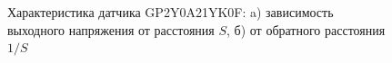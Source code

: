 \documentclass[12pt]{article}
\begin{document}
\begin{figure}[H]
    \centering
    \begin{minipage}[H]{0.49\linewidth}
    \end{minipage}
    \begin{minipage}[H]{0.49\linewidth}
    \end{minipage}
    \caption{Характеристика датчика GP2Y0A21YK0F: a) зависимость выходного напряжения от расстояния \(S\), б) от обратного расстояния \(1/S\)}\label{vlplot}
\end{figure}
\end{document}
